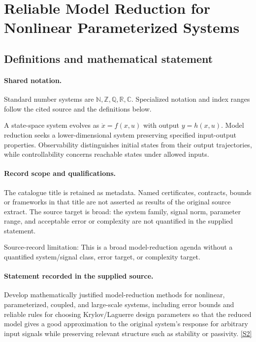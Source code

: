 \documentclass[11pt]{article}
\newcommand{\sref}[2]{\hyperlink{source:#1:#2}{[S#2]}}
\begin{document}
\section{Reliable Model Reduction for Nonlinear Parameterized Systems}\label{statement}

\subsection{Definitions and mathematical statement}

\paragraph{Shared notation.}Standard number systems are $\mathbb N,\mathbb Z,\mathbb Q,\mathbb R,\mathbb C$. Specialized notation and index ranges follow the cited source and the definitions below.


A state-space system evolves as $\dot x=f(x,u)$ with output $y=h(x,u)$. Model reduction seeks a lower-dimensional system preserving specified input-output properties. Observability distinguishes initial states from their output trajectories, while controllability concerns reachable states under allowed inputs.
\paragraph{Record scope and qualifications.}
The catalogue title is retained as metadata. Named certificates, contracts, bounds or frameworks in that title are not asserted as results of the original source extract.
The source target is broad: the system family, signal norm, parameter range, and acceptable error or complexity are not quantified in the supplied statement.

Source-record limitation: This is a broad model-reduction agenda without a quantified system/signal class, error target, or complexity target.
\paragraph{Statement recorded in the supplied source.}
Develop mathematically justified model-reduction methods for nonlinear, parameterized, coupled, and large-scale systems, including error bounds and reliable rules for choosing Krylov/Laguerre design parameters so that the reduced model gives a good approximation to the original system's response for arbitrary input signals while preserving relevant structure such as stability or passivity. \sref{statement}{2}
\end{document}
